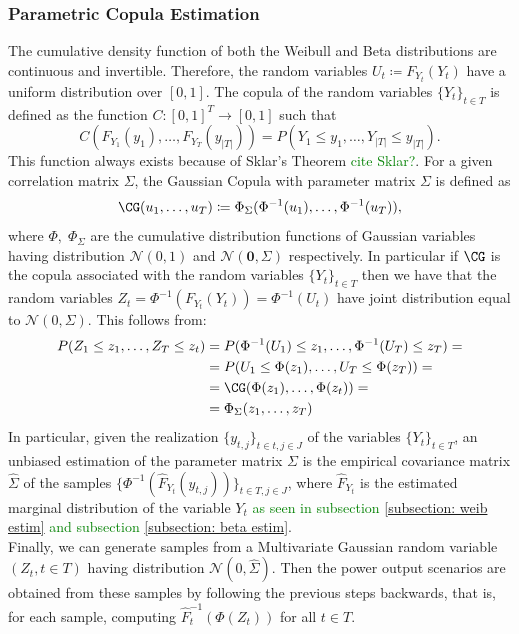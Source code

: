 {\subsubsection{Parametric Copula Estimation}
The cumulative density function of both the Weibull and Beta distributions are continuous and invertible. Therefore, the random variables \( U_t \coloneqq F_{Y_t}(Y_t) \) have a uniform distribution over \([0,1]\). The copula of the random variables \(\{Y_t\}_{t \in T}\) is defined as the function \(C: [0,1]^T \to [0,1]\) such that 
\begin{equation}
C(F_{Y_1}(y_1), \ldots, F_{Y_T}(y_{|T|})) = P(Y_1 \leq y_1, \ldots, Y_{|T|} \leq y_{|T|}).
\end{equation}
This function always exists because of Sklar's Theorem \textcolor{green}{cite Sklar?}. For a given correlation matrix \(\Sigma\), the Gaussian Copula with parameter matrix \(\Sigma\) is defined as 
\[\CG(u_1,\ldots,u_{T}) \coloneqq \Phi_{\Sigma}(\Phi^{-1}(u_1),\ldots, \Phi^{-1}(u_T)),\] 
where \(\Phi,\; \Phi_{\Sigma}\) are the cumulative distribution functions of Gaussian variables having distribution \(\mathcal{N}(0,1)\) and \( \mathcal{N}(\mathbf{0},\Sigma)\) respectively. 
In particular if \(\CG\) is the copula associated with the random variables \(\{Y_t\}_{t \in T}\) then we have that the random variables \(Z_t = \Phi^{-1}(F_{Y_t}(Y_t)) = \Phi^{-1}(U_t)\) have joint distribution equal to \(\mathcal{N}(0, \Sigma)\). This follows from: \\
\begin{align*}
P(Z_1 \leq z_1, \ldots, Z_T \leq z_t) &= P(\Phi^{-1}(U_1) \leq z_1, \ldots, \Phi^{-1}(U_T) \leq z_T) = \\
&= P(U_1 \leq \Phi(z_1), \ldots, U_T \leq \Phi(z_T)) = \\
&= \CG(\Phi(z_1), \ldots, \Phi(z_t)) =  \\
&= \Phi_{\Sigma}(z_1, \ldots, z_T)
\end{align*}
In particular, given the realization \(\{y_{t,j}\}_{t \in t, j \in J}\) of the variables \(\{Y_t\}_{t \in T}\), an unbiased estimation of the parameter matrix \(\Sigma\) is the empirical covariance matrix \(\hat \Sigma\) of the samples \(\{\Phi^{-1}(\hat{F}_{Y_t}(y_{t,j}))\}_{t\in T, j \in J}\), where \(\hat{F}_{Y_t}\) is the estimated marginal distribution of the variable \(Y_t\) \textcolor{green}{as seen in subsection \ref{subsection: weib estim} and subsection \ref{subsection: beta estim}}.\\


Finally, we can generate samples from a Multivariate Gaussian random variable \((Z_{t}, t \in T)\) having distribution \(\mathcal{N}(0, \hat \Sigma)\).  Then the power output scenarios are obtained from these samples by following the previous steps backwards, that is, for each sample, computing \(\hat F_{t}^{-1}(\Phi(Z_{t}))\) for all \(t\in T\). \\







}
